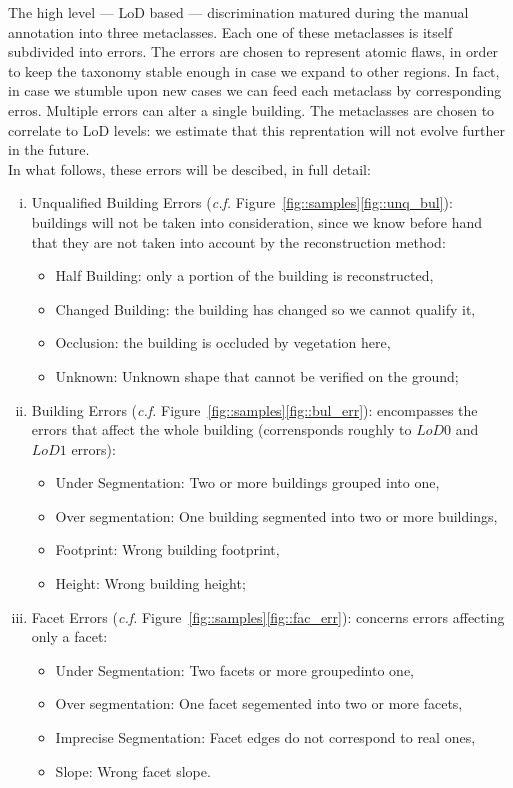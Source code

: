 \documentclass[../main.tex]{subfiles}
\begin{document}
    The high level --- LoD based --- discrimination matured during the manual annotation into three metaclasses. Each one of these metaclasses is itself subdivided into errors. The errors are chosen to represent atomic flaws, in order to keep the taxonomy stable enough in case we expand to other regions. In fact, in case we stumble upon new cases we can feed each metaclass by corresponding erros. Multiple errors can alter a single building. The metaclasses are chosen to correlate to LoD levels: we estimate that this reprentation will not evolve further in the future.\\

    In what follows, these errors will be descibed, in full detail:

    \begin{enumerate}[(i)]
        \item Unqualified Building Errors (\textit{c.f.} Figure~\ref{fig::samples}\ref{fig::unq_bul}): buildings will not be taken into consideration, since we know before hand that they are not taken into account by the reconstruction method:
        \begin{itemize}
            \item Half Building: only a portion of the building is reconstructed,
            \item Changed Building: the building has changed so we cannot qualify it,
            \item Occlusion: the building is occluded by vegetation here,
            \item Unknown: Unknown shape that cannot be verified on the ground;
        \end{itemize}
        \item Building Errors (\textit{c.f.} Figure~\ref{fig::samples}\ref{fig::bul_err}): encompasses the errors that affect the whole building (corrensponds roughly to $LoD0$ and $LoD1$ errors):
        \begin{itemize}
            \item Under Segmentation: Two or more buildings grouped into one,
            \item Over segmentation: One building segmented into two or more buildings,
            \item Footprint: Wrong building footprint,
            \item Height: Wrong building height;
        \end{itemize}
        \item Facet Errors (\textit{c.f.} Figure~\ref{fig::samples}\ref{fig::fac_err}): concerns errors affecting only a facet:
        \begin{itemize}
            \item Under Segmentation: Two facets or more groupedinto one,
            \item Over segmentation: One facet segemented into two or more facets,
            \item Imprecise Segmentation: Facet edges do not correspond to real ones,
            \item Slope: Wrong facet slope.
        \end{itemize}
    \end{enumerate}
\end{document}
